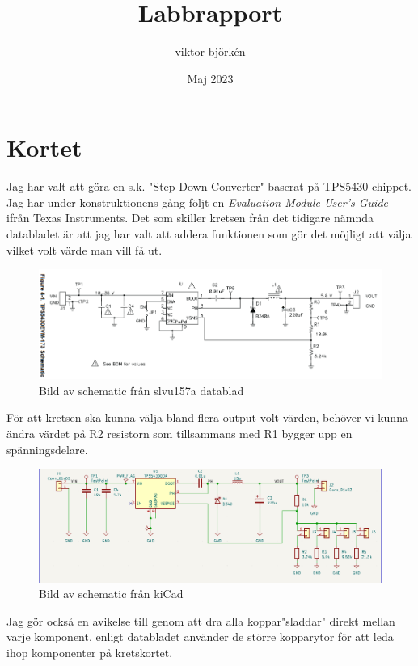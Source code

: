 \documentclass{article}
\title{Labbrapport}
\author{viktor björkén }
\date{Maj 2023}
\begin{document}
\maketitle

\section{Kortet}

Jag har valt att göra en s.k. "Step-Down Converter" baserat på TPS5430 chippet. Jag har under konstruktionens gång följt en \textit{Evaluation Module User's Guide} ifrån Texas Instruments. Det som skiller kretsen från det tidigare nämnda databladet är att jag har valt att addera funktionen som gör det möjligt att välja vilket volt värde man vill få ut. 

\begin{figure}[htp]
    \centering
    \includegraphics[width=15cm]{img/nyschema.png}
    \caption{Bild av schematic från slvu157a datablad}
\end{figure}

För att kretsen ska kunna välja bland flera output volt värden, behöver vi kunna ändra värdet på R2 resistorn som tillsammans med R1 bygger upp en spänningsdelare.

\begin{figure}[htp]
    \centering
    \includegraphics[width=15cm]{img/schema.png}
    \caption{Bild av schematic från kiCad}
\end{figure}

Jag gör också en avikelse till genom att dra alla koppar"sladdar" direkt mellan varje komponent, enligt databladet använder de större kopparytor för att leda ihop komponenter på kretskortet. 
\end{document}
